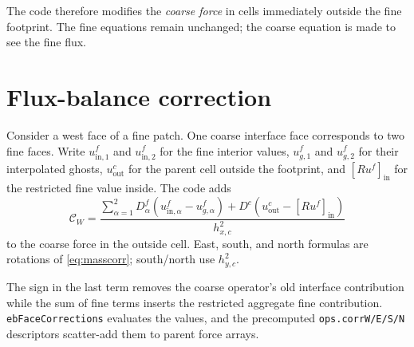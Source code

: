 \documentclass[11pt,oneside,openany]{book}
\newcommand{\code}[1]{\textnormal{\texttt{#1}}}
\begin{document}
The code therefore modifies the \emph{coarse force} in cells immediately outside the fine footprint. The fine equations remain unchanged; the coarse equation is made to see the fine flux.

\section{Flux-balance correction}
Consider a west face of a fine patch. One coarse interface face corresponds to two fine faces. Write $u^f_{\mathrm{in},1}$ and $u^f_{\mathrm{in},2}$ for the fine interior values, $u^f_{g,1}$ and $u^f_{g,2}$ for their interpolated ghosts, $u^c_{\mathrm{out}}$ for the parent cell outside the footprint, and $[Ru^f]_{\mathrm{in}}$ for the restricted fine value inside. The code adds
\begin{equation}
 \mathcal{C}_W
 =\frac{
   \displaystyle\sum_{\alpha=1}^{2}
      D^f_{\alpha}\left(u^f_{\mathrm{in},\alpha}-u^f_{g,\alpha}\right)
   +D^c\left(u^c_{\mathrm{out}}-[Ru^f]_{\mathrm{in}}\right)
 }{h_{x,c}^{2}}
 \label{eq:masscorr}
\end{equation}
to the coarse force in the outside cell. East, south, and north formulas are rotations of \cref{eq:masscorr}; south/north use $h_{y,c}^2$.

The sign in the last term removes the coarse operator's old interface contribution while the sum of fine terms inserts the restricted aggregate fine contribution. \code{ebFaceCorrections} evaluates the values, and the precomputed \code{ops.corrW/E/S/N} descriptors scatter-add them to parent force arrays.
\end{document}
